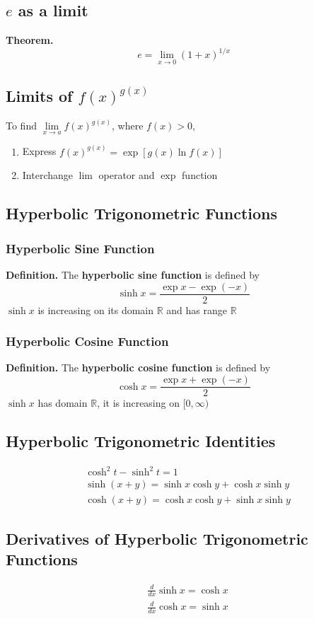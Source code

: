 \documentclass[../ma2002_notes.tex]{subfiles}
\begin{document}
\subsection{$e$ as a limit}
\textbf{Theorem.}
\[e=\lim_{x\to0}(1+x)^{1/x}\]

\subsection{Limits of $f(x)^{g(x)}$}
To find \(\lim\limits_{x\to a}f(x)^{g(x)}\), where \(f(x)>0\),
\begin{enumerate}
	\item Express \(f(x)^{g(x)}=\exp[g(x)\ln f(x)]\)
	\item Interchange \(\lim\) operator and \(\exp\) function
\end{enumerate}

\subsection{Hyperbolic Trigonometric Functions}
\subsubsection{Hyperbolic Sine Function}
\textbf{Definition.} The \textbf{hyperbolic sine function} is defined by
\[\sinh x=\frac{\exp x-\exp(-x)}{2}\]
\(\sinh x\) is increasing on its domain \(\mathbb{R}\) and has range \(\mathbb{R}\)

\subsubsection{Hyperbolic Cosine Function}
\textbf{Definition.} The \textbf{hyperbolic cosine function} is defined by
\[\cosh x=\frac{\exp x+\exp(-x)}{2}\]
\(\sinh x\) has domain \(\mathbb{R}\), it is increasing on \([0,\infty)\)

\subsection{Hyperbolic Trigonometric Identities}
\begin{align*}
	&\cosh^2t-\sinh^2t=1\\
	&\sinh(x+y)=\sinh x\cosh y+\cosh x\sinh y\\
	&\cosh(x+y)=\cosh x\cosh y+\sinh x\sinh y
\end{align*}

\subsection{Derivatives of Hyperbolic Trigonometric Functions}
\begin{align*}
	&\frac{d}{dx}\sinh x=\cosh x\\
	&\frac{d}{dx}\cosh x=\sinh x
\end{align*}
\end{document}
